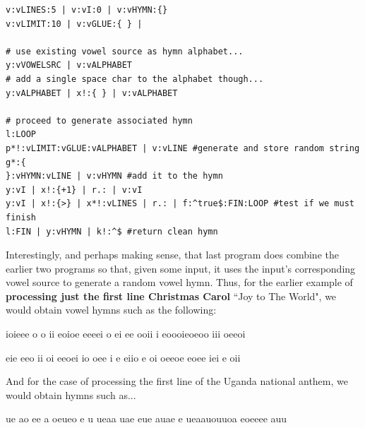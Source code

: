 \documentclass[a4paper, 18pt]{book} %
\begin{document}
{{{\begin{tcolorbox}[teaterminalstyle, title=TEA Application: A VOWEL RANDOM HYMN ENCODER v1, breakable]
\begin{lstlisting}[language=TEA,breaklines=true,]
v:vLINES:5 | v:vI:0 | v:vHYMN:{}
v:vLIMIT:10 | v:vGLUE:{ } | 

# use existing vowel source as hymn alphabet...
y:vVOWELSRC | v:vALPHABET
# add a single space char to the alphabet though...
y:vALPHABET | x!:{ } | v:vALPHABET

# proceed to generate associated hymn
l:LOOP
p*!:vLIMIT:vGLUE:vALPHABET | v:vLINE #generate and store random string
g*:{
}:vHYMN:vLINE | v:vHYMN #add it to the hymn
y:vI | x!:{+1} | r.: | v:vI 
y:vI | x!:{>} | x*!:vLINES | r.: | f:^true$:FIN:LOOP #test if we must finish
l:FIN | y:vHYMN | k!:^$ #return clean hymn
   \end{lstlisting}
  \end{tcolorbox}
  \label{FIGTEAVOWELHYMNENCODE}

\vspace{1em}


Interestingly, and perhaps making sense, that last program does combine the earlier two programs so that, given some input, it uses the input's corresponding vowel source to generate a random vowel hymn. Thus, for the earlier example of \textbf{processing just the first line Christmas Carol} ``Joy to The World", we would obtain vowel hymns such as the following:


\vspace{2em}
  
   \begin{tcbverbatim}[title=Sample Vowel Hymn OUTPUT 1]
ioieee o o
 ii eoioe
eeeei o ei
ee ooii i 
eoooieoeoo
 iii oeeoi
  \end{tcbverbatim}
 

\vspace{2em}


\vspace{2em}
  
   \begin{tcbverbatim}[title=Sample Vowel Hymn OUTPUT 2]
eie eeo ii
 oi eeoei
io oee i e
eiio e oi 
oeeoe eoee
 iei e oii
  \end{tcbverbatim}
 

\vspace{2em}


And for the case of processing the first line of the Uganda national anthem, we would obtain hymns such as...



\vspace{2em}
  
   \begin{tcbverbatim}[title=Sample Vowel Hymn OUTPUT 3]
ue ao ee a
oeueo e u
 ueaa uae 
eue auae e
ueaauouuoa
eoeeee auu
  \end{tcbverbatim}
 

}}}
\end{document}
